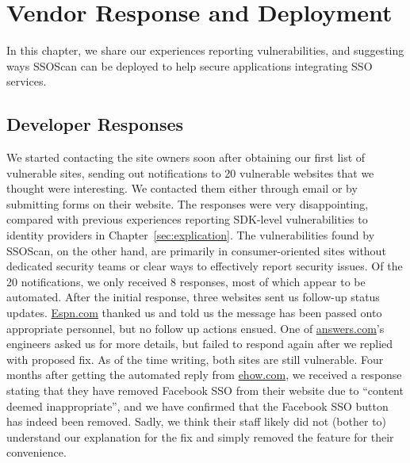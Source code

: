 \section{Vendor Response and Deployment}
\label{sec:ssoscanDeployment}

In this chapter, we share our experiences reporting vulnerabilities, and suggesting ways SSOScan can be deployed to help secure applications integrating SSO services.

\subsection{Developer Responses}
\label{sec:ssoscanDeploymentDeveloperResponses}

We started contacting the site owners soon after obtaining our first list of vulnerable sites, sending out notifications to 20 vulnerable websites that we thought were interesting.  We contacted them either through email or by submitting forms on their website.  The responses were very disappointing, compared with previous experiences reporting SDK-level vulnerabilities to identity providers in Chapter~\ref{sec:explication}.  The vulnerabilities found by SSOScan, on the other hand, are primarily in consumer-oriented sites without dedicated security teams or clear ways to effectively report security issues.  Of the 20 notifications, we only received 8 responses, most of which appear to be automated.  After the initial response, three websites sent us follow-up status updates.  \url{Espn.com} thanked us and told us the message has been passed onto appropriate personnel, but no follow up actions ensued.  One of \url{answers.com}'s engineers asked us for more details, but failed to respond again after we replied with proposed fix.  As of the time writing, both sites are still vulnerable.  Four months after getting the automated reply from \url{ehow.com}, we received a response stating that they have removed Facebook SSO from their website due to ``content deemed inappropriate'', and we have confirmed that the Facebook SSO button has indeed been removed.  Sadly, we think their staff likely did not (bother to) understand our explanation for the fix and simply removed the feature for their convenience.

